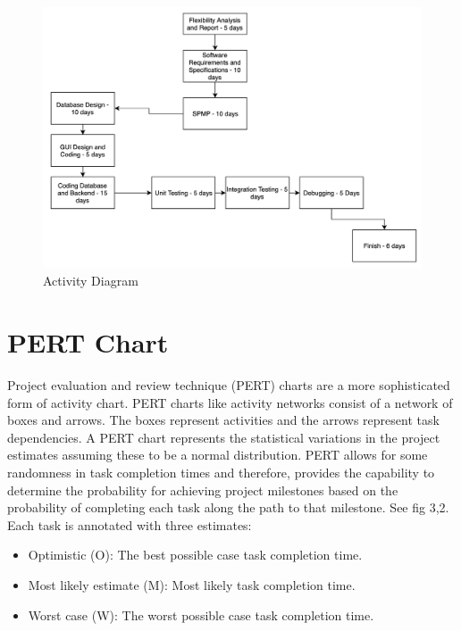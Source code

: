 \documentclass[12pt]{report}
\begin{document}
\begin{figure}[h]
\centering
\includegraphics[width=15cm]{activitydiagram.png}
\caption{Activity Diagram}
\end{figure}

\section{PERT Chart}

Project evaluation and review technique (PERT) charts are a more sophisticated form of activity chart. PERT charts like activity networks consist of a network of boxes and arrows. The boxes represent activities and the arrows represent task dependencies. A PERT chart represents the statistical variations in the project estimates assuming these to be a normal distribution. PERT allows for some randomness in task completion times and therefore, provides the capability to determine the probability for achieving project milestones based on the probability of completing each task along the path to that milestone. See fig 3,2. Each task is annotated with three estimates:

\begin{itemize}
    \item Optimistic (O): The best possible case task completion time.
    \item Most likely estimate (M): Most likely task completion time.
    \item Worst case (W): The worst possible case task completion time.
\end{itemize}
\end{document}
